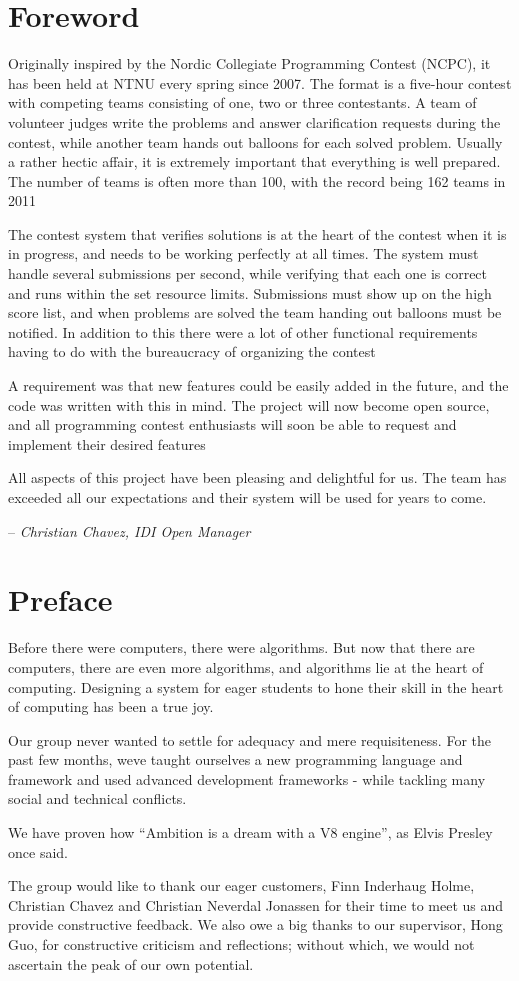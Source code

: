 \section*{Foreword}
Originally inspired by the Nordic Collegiate Programming Contest (NCPC),
it has been held at NTNU every spring since 2007. The format is a
five-hour contest with competing teams consisting of one, two or three
contestants. A team of volunteer judges write the problems and answer
clarification requests during the contest, while another team hands out
balloons for each solved problem. Usually a rather hectic affair, it is
extremely important that everything is well prepared. The number of
teams is often more than 100, with the record being 162 teams in 2011

The contest system that verifies solutions is at the heart of the
contest when it is in progress, and needs to be working perfectly at
all times. The system must handle several submissions per second, while
verifying that each one is correct and runs within the set resource
limits. Submissions must show up on the high score list, and when
problems are solved the team handing out balloons must be notified. In
addition to this there were a lot of other functional requirements
having to do with the bureaucracy of organizing the contest

A requirement was that new features could be easily added in the future,
and the code was written with this in mind. The project will now become
open source, and all programming contest enthusiasts will soon be able
to request and implement their desired features

All aspects of this project have been pleasing and delightful for us.
The team has exceeded all our expectations and their system will be
used for years to come.

\hfill -- \textit{Christian Chavez, IDI Open Manager}

\pagebreak

\section*{Preface}

Before there were computers, there were algorithms. But now that there are
computers, there are even more algorithms, and algorithms lie at the heart of
computing. Designing a system for eager students to hone their skill in the
heart of computing has been a true joy.

Our group never wanted to settle for adequacy and mere requisiteness. For the
past few months, weve taught ourselves a new programming language and framework
and used advanced development frameworks - while tackling many social and
technical conflicts.

We have proven how ``Ambition is a dream with a V8 engine'', as Elvis Presley
once said.

The group would like to thank our eager customers, Finn Inderhaug Holme,
Christian Chavez and Christian Neverdal Jonassen for their time to meet us and
provide constructive feedback. We also owe a big thanks to our supervisor, Hong
Guo, for constructive criticism and reflections; without which, we would not
ascertain the peak of our own potential.
